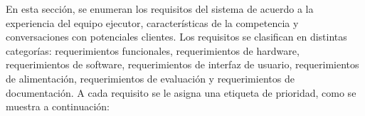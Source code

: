 
%
%
%
%
%
%
En esta sección, se enumeran los requisitos del sistema de acuerdo a la experiencia del equipo ejecutor, características de la competencia y conversaciones con potenciales clientes. Los requisitos se clasifican en distintas categorías: requerimientos funcionales, requerimientos de hardware, requerimientos de software, requerimientos de interfaz de usuario, requerimientos de alimentación, requerimientos de evaluación y requerimientos de documentación. A cada requisito se le asigna una etiqueta de prioridad, como se muestra a continuación:
